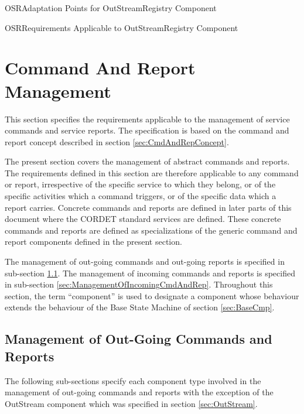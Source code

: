 \documentclass{pnp_article}
\begin{document}
\begin{crAp}{OSR}{Adaptation Points for OutStreamRegistry Component}
\end{crAp}

\begin{crReq}{OSR}{Requirements Applicable to OutStreamRegistry Component}
\end{crReq}



\section{Command And Report Management}\label{sec:CmdAndRepManagement}

This section specifies the requirements applicable to the management of service commands and service reports. The specification is based on the command and report concept described in section \ref{sec:CmdAndRepConcept}. 

The present section covers the management of abstract commands and reports. The requirements defined in this section are therefore applicable to any command or report, irrespective of the specific service to which they belong, or of the specific activities which a command triggers, or of the specific data which a report carries. Concrete commands and reports are defined in later parts of this document where the CORDET standard services are defined. These concrete commands and reports are defined as specializations of the generic command and report components defined in the present section. 

The management of out-going commands and out-going reports is specified in sub-section \ref{sec:ManagementOfOutGoingCmdAndRep}. The management of incoming commands and reports is specified in sub-section \ref{sec:ManagementOfIncomingCmdAndRep}. Throughout this section, the term “component” is used to designate a component whose behaviour extends the behaviour of the Base State Machine of section \ref{sec:BaseCmp}. 

\subsection{Management of Out-Going Commands and Reports}\label{sec:ManagementOfOutGoingCmdAndRep}
 

The following sub-sections specify each component type involved in the management of out-going commands and reports with the exception of the OutStream component which was specified in section \ref{sec:OutStream}. 
\end{document}
